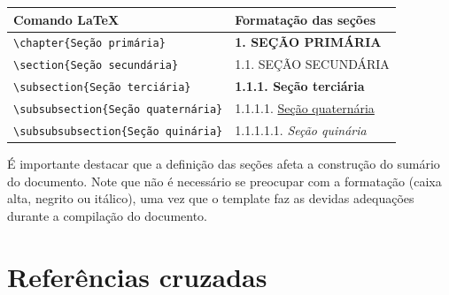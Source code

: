 \documentclass[
	12pt,				%
	oneside,			%
	a4paper,			%
	chapter=TITLE,		%
	section=TITLE,		%
	english,			%
	brazil,				%
	]{abntex2}
\begin{document}
\begin{apendicesenv}
    \begin{quadro}[htb]
        \centering
        \caption{Comandos do \LaTeX~para divisões de capítulo, seção e subseção.}
        \begin{tabular}{|l|l|}
            \hline
            Comando \LaTeX                           & Formatação das seções                  \\ \hline
            \verb|\chapter{Seção primária}|          & \textbf{1. SEÇÃO PRIMÁRIA}             \\ \hline
            \verb|\section{Seção secundária}|        & 1.1. SEÇÃO SECUNDÁRIA                  \\ \hline
            \verb|\subsection{Seção terciária}|      & \textbf{1.1.1. Seção terciária}        \\ \hline
            \verb|\subsubsection{Seção quaternária}| & 1.1.1.1. \underline{Seção quaternária} \\ \hline
            \verb|\subsubsubsection{Seção quinária}| & 1.1.1.1.1. \textit{Seção quinária}     \\ \hline
        \end{tabular}
        \label{Quad:comandos_secoes}
    \end{quadro}

    É importante destacar que a definição das seções afeta a construção do sumário do documento.
    Note que não é necessário se preocupar com a formatação (caixa alta, negrito ou itálico), uma vez que o template faz as devidas adequações durante a compilação do documento.

    \section{Referências cruzadas}
    \label{Sec:template_referencias}


\end{apendicesenv}
\end{document}
